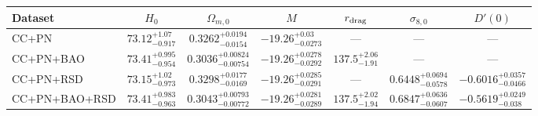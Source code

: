 \begin{tabular}{lcccccc}
\hline
Dataset & $H_0$ & $\Omega_{m,0}$ & $M$ & $r_{\rm drag}$ & $\sigma_{8,0}$ & $D'(0)$ \\
\hline
CC+PN & $73.12^{+1.07}_{-0.917}$ & $0.3262^{+0.0194}_{-0.0154}$ & $-19.26^{+0.03}_{-0.0273}$ & — & — & — \\
CC+PN+BAO & $73.41^{+0.995}_{-0.954}$ & $0.3036^{+0.00824}_{-0.00754}$ & $-19.26^{+0.0278}_{-0.0292}$ & $137.5^{+2.06}_{-1.91}$ & — & — \\
CC+PN+RSD & $73.15^{+1.02}_{-0.973}$ & $0.3298^{+0.0177}_{-0.0169}$ & $-19.26^{+0.0285}_{-0.0291}$ & — & $0.6448^{+0.0694}_{-0.0578}$ & $-0.6016^{+0.0357}_{-0.0466}$ \\
CC+PN+BAO+RSD & $73.41^{+0.983}_{-0.963}$ & $0.3043^{+0.00793}_{-0.00772}$ & $-19.26^{+0.0281}_{-0.0289}$ & $137.5^{+2.02}_{-1.94}$ & $0.6847^{+0.0636}_{-0.0607}$ & $-0.5619^{+0.0249}_{-0.038}$ \\
\hline
\end{tabular}

